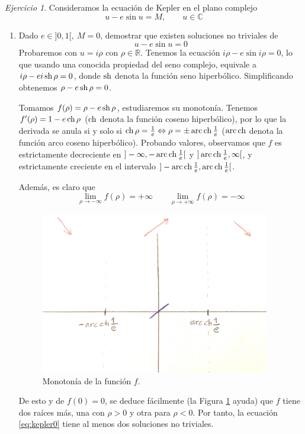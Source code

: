 \documentclass[12pt,spanish]{article}
\theoremstyle{definition}
\theoremstyle{remark}
\newtheorem{exercise}{Ejercicio}
\begin{document}
\newpage
\setcounter{exercise}{12}
\begin{exercise}
  Consideramos la ecuación de Kepler en el plano complejo
  \[u-e\sin u = M,\qquad u\in\mathbb{C}\]
  \begin{enumerate}[$i)$]
  \item Dado $e\in]0,1[,\ M=0$, demostrar que existen soluciones no
    triviales de
    \begin{equation}\label{eq:kepler0}
      u-e\sin u=0
    \end{equation}
    Probaremos con $u=i\rho$ con $\rho\in\mathbb{R}$.
    Tenemos la ecuación $i\rho-e\sin i\rho=0$, lo que usando una
    conocida propiedad del seno complejo, equivale a
    $i\rho-e i\operatorname{sh}\rho=0$, donde $\operatorname{sh}$ denota la función seno
    hiperbólico. Simplificando obtenemos $\rho-e \operatorname{sh}\rho=0$.

    Tomamos $f(\rho)=\rho-e \operatorname{sh}\rho$, estudiaremos su
    monotonía. Tenemos $f'(\rho)=1-e\operatorname{ch}\rho$ ($\operatorname{ch}$ denota la función
    coseno hiperbólico), por lo que la derivada se anula si y solo si
    $\operatorname{ch}\rho=\frac{1}{e}\Leftrightarrow \rho=\pm \operatorname{arc}\operatorname{ch}\frac{1}{e}$
    ($\operatorname{arc}\operatorname{ch}$ denota la función arco coseno hiperbólico). Probando
    valores, observamos que $f$ es estrictamente decreciente en
    $]-\infty,-\operatorname{arc}\operatorname{ch}\frac{1}{e}[$ y $]\operatorname{arc}\operatorname{ch}\frac{1}{e},\infty[$, y
    estrictamente creciente en el intervalo
    $]-\operatorname{arc}\operatorname{ch}\frac{1}{e},\operatorname{arc}\operatorname{ch}\frac{1}{e}[$.

    Además, es claro que
    \[\lim_{\rho\to-\infty}f(\rho)=+\infty\qquad\lim_{\rho\to+\infty}f(\rho)=-\infty\]

    \begin{figure}[H]
      \centering
      \includegraphics[width=100mm]{f-rho}
      \caption{Monotonía de la función $f$.}
      \label{fig:f-rho}
    \end{figure}

    De esto y de $f(0)=0$, se deduce fácilmente (la Figura
    \ref{fig:f-rho} ayuda) que $f$ tiene dos raíces más, una
    con $\rho>0$ y otra para $\rho<0$. Por tanto, la ecuación
    \ref{eq:kepler0} tiene al menos dos soluciones no triviales.


\end{enumerate}
\end{exercise}
\end{document}
